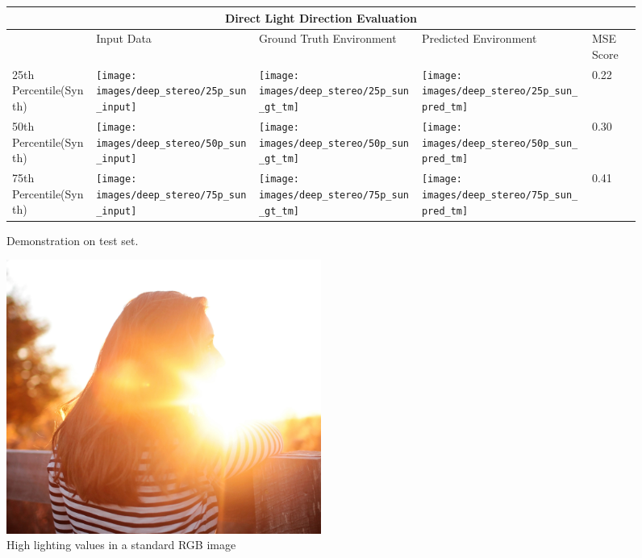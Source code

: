 \documentclass[ %
                    author={Gavin Parker},
                supervisor={Dr. Neill Campbell},
                    degree={MEng},
                     title={Deep Siamese Networks for Illumination Estimation from Stereo Images},
                  subtitle={},
                      type={research},
                      year={2018} ]{dissertation}
\begin{document}
\begin{figure}
\centering
\begin{tabular}{ |p{3cm}||p{3cm}|p{3cm}|p{3cm}|p{3cm}|  }
 \hline
 \multicolumn{5}{|c|}{Direct Light Direction Evaluation} \\
 \hline
  & Input Data &Ground Truth Environment&Predicted Environment&MSE Score\\
 \hline
 25th Percentile(Synth)&\parbox[c]{1em}{
 \texttt{[image: images/deep\_stereo/25p\_sun\_input]}}&\parbox[c]{1em}{\texttt{[image: images/deep\_stereo/25p\_sun\_gt\_tm]}}&
\parbox[c]{1em}{\texttt{[image: images/deep\_stereo/25p\_sun\_pred\_tm]}}& 0.22\\
 50th Percentile(Synth)&\parbox[c]{1em}{
 \texttt{[image: images/deep\_stereo/50p\_sun\_input]}}&\parbox[c]{1em}{\texttt{[image: images/deep\_stereo/50p\_sun\_gt\_tm]}}&
\parbox[c]{1em}{\texttt{[image: images/deep\_stereo/50p\_sun\_pred\_tm]}}& 0.30\\
 75th Percentile(Synth)&\parbox[c]{1em}{
 \texttt{[image: images/deep\_stereo/75p\_sun\_input]}}&\parbox[c]{1em}{\texttt{[image: images/deep\_stereo/75p\_sun\_gt\_tm]}}&
\parbox[c]{1em}{\texttt{[image: images/deep\_stereo/75p\_sun\_pred\_tm]}}& 0.41\\
 \hline
\end{tabular}

\label{mse_results}
\caption{Demonstration on test set.}

\end{figure}
\begin{figure}[h]
\centering
\includegraphics[width=0.5\textwidth]{exposure_example}
\caption{High lighting values in a standard RGB image}
\label{rgb_example}
\end{figure}
\end{document}
